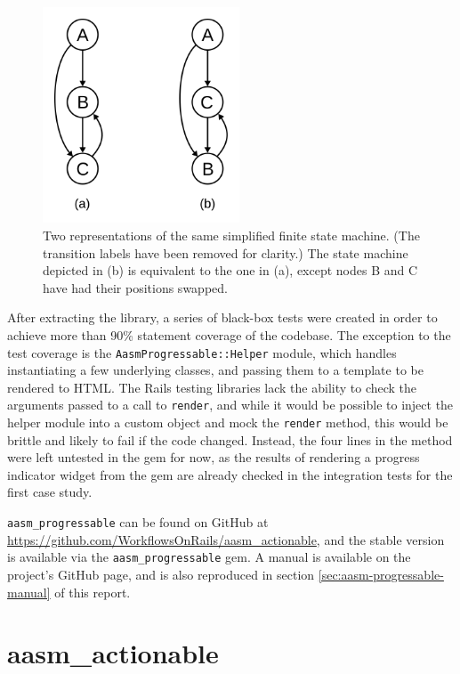 \documentclass[document.tex]{subfiles}
\begin{document}
\begin{figure}[!htbp]
  \centering
  \includegraphics[width=2.3in]{./img/platform/equivalent-fsms}
  \cprotect
  \caption{Two representations of the same simplified finite state machine. (The transition labels have been removed for clarity.) The state machine depicted in (b) is equivalent to the one in (a), except nodes B and C have had their positions swapped.}
  \label{fig:equivalent-fsms}
\end{figure}

After extracting the library, a series of black-box tests were created in order to achieve more than 90\% statement coverage of the codebase. The exception to the test coverage is the \verb!AasmProgressable::Helper! module, which handles instantiating a few underlying classes, and passing them to a template to be rendered to HTML. The Rails testing libraries lack the ability to check the arguments passed to a call to \verb!render!, and while it would be possible to inject the helper module into a custom object and mock the \verb!render! method, this would be brittle and likely to fail if the code changed. Instead, the four lines in the method were left untested in the gem for now, as the results of rendering a progress indicator widget from the gem are already checked in the integration tests for the first case study.

\verb!aasm_progressable! can be found on GitHub at \url{https://github.com/WorkflowsOnRails/aasm_actionable}, and the stable version is available via the \verb!aasm_progressable! gem. A manual is available on the project's GitHub page, and is also reproduced in section \ref{sec:aasm-progressable-manual} of this report.

\FloatBarrier

\section {aasm\_actionable}
\end{document}

